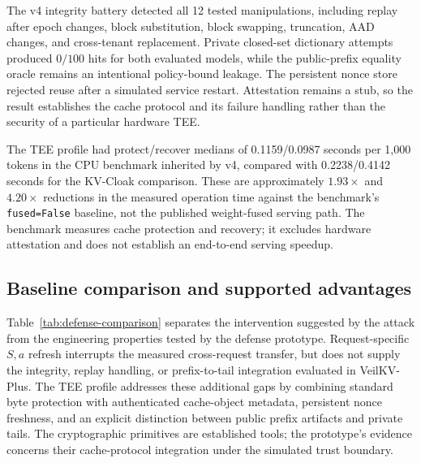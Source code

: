 The v4 integrity battery detected all 12 tested manipulations, including replay after epoch changes, block substitution, block swapping, truncation, AAD changes, and cross-tenant replacement. Private closed-set dictionary attempts produced $0/100$ hits for both evaluated models, while the public-prefix equality oracle remains an intentional policy-bound leakage. The persistent nonce store rejected reuse after a simulated service restart. Attestation remains a stub, so the result establishes the cache protocol and its failure handling rather than the security of a particular hardware TEE.

The TEE profile had protect/recover medians of 0.1159/0.0987 seconds per 1,000 tokens in the CPU benchmark inherited by v4, compared with 0.2238/0.4142 seconds for the KV-Cloak comparison. These are approximately $1.93\times$ and $4.20\times$ reductions in the measured operation time against the benchmark's \texttt{fused=False} baseline, not the published weight-fused serving path. The benchmark measures cache protection and recovery; it excludes hardware attestation and does not establish an end-to-end serving speedup.

\subsection{Baseline comparison and supported advantages}
\label{sec:defense-comparison}
Table~\ref{tab:defense-comparison} separates the intervention suggested by the attack from the engineering properties tested by the defense prototype. Request-specific $S,a$ refresh interrupts the measured cross-request transfer, but does not supply the integrity, replay handling, or prefix-to-tail integration evaluated in VeilKV-Plus. The TEE profile addresses these additional gaps by combining standard byte protection with authenticated cache-object metadata, persistent nonce freshness, and an explicit distinction between public prefix artifacts and private tails. The cryptographic primitives are established tools; the prototype's evidence concerns their cache-protocol integration under the simulated trust boundary.

